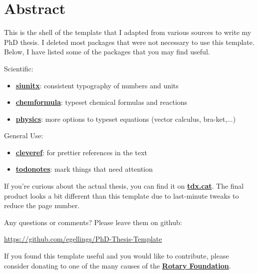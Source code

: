 \chapter*{Abstract}\label{ch:abstract}

This is the shell of the template that I adapted from various sources to write my PhD thesis. I deleted most packages that were not necessary to use this template. Below, I have listed some of the packages that you may find useful.

Scientific:
\begin{itemize}
	\item \textbf{\href{https://ctan.org/pkg/siunitx}{siunitx}}: consistent typography of numbers and units
	\item \textbf{\href{https://ctan.org/pkg/chemformula}{chemformula}}: typeset chemical formulas and reactions
	\item \textbf{\href{https://ctan.org/pkg/physics}{physics}}: more options to typeset equations (vector calculus, bra-ket,...)
\end{itemize}

General Use:
\begin{itemize}
	\item \textbf{\href{https://ctan.org/pkg/cleveref}{cleveref}}: for prettier references in the text
	\item \textbf{\href{https://ctan.org/pkg/todonotes}{todonotes}}: mark things that need attention
\end{itemize}

If you're curious about the actual thesis, you can find it on \textbf{\href{https://www.tdx.cat/handle/10803/668853}{tdx.cat}}. The final product looks a bit different than this template due to last-minute tweaks to reduce the page number.

Any questions or comments? Please leave them on github: 

\url{https://github.com/egellings/PhD-Thesis-Template}

\vfill
If you found this template useful and you would like to contribute, please consider donating to one of the many causes of the \textbf{\href{https://my.rotary.org/en/donate}{Rotary Foundation}}.